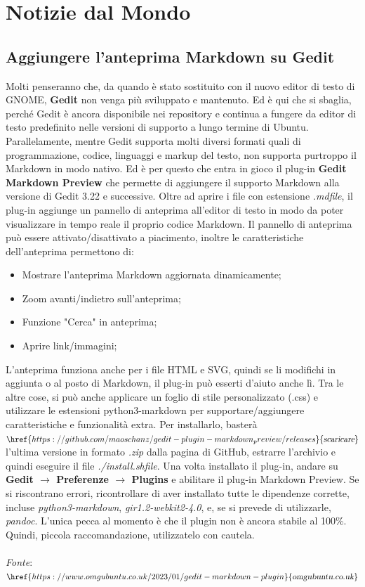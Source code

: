 \documentclass[a4paper,twoside]{article}
\begin{document}
\section{Notizie dal Mondo}
\subsection{Aggiungere l'anteprima Markdown su Gedit}
Molti penseranno che, da quando è stato sostituito con il nuovo editor di testo di GNOME, \textbf{Gedit} non venga più sviluppato e mantenuto. Ed è qui che si sbaglia, perché Gedit è ancora disponibile nei repository e continua a fungere da editor di testo predefinito nelle versioni di supporto a lungo termine di Ubuntu. Parallelamente, mentre Gedit supporta molti diversi formati quali di programmazione, codice, linguaggi e markup del testo, non supporta purtroppo il Markdown in modo nativo. Ed è per questo che entra in gioco il plug-in \textbf{Gedit Markdown Preview} che permette di aggiungere il supporto Markdown alla versione di Gedit 3.22 e successive. Oltre ad aprire i file con estensione \textsl{.mdfile}, il plug-in aggiunge un pannello di anteprima all'editor di testo in modo da poter visualizzare in tempo reale il proprio codice Markdown. Il pannello di anteprima può essere attivato/disattivato a piacimento, inoltre le caratteristiche dell'anteprima permettono di:

\begin{itemize}
\item Mostrare l'anteprima Markdown aggiornata dinamicamente;
\item Zoom avanti/indietro sull'anteprima;
\item Funzione "Cerca" in anteprima;
\item Aprire link/immagini;
\end{itemize}

L'anteprima funziona anche per i file HTML e SVG, quindi se li modifichi in aggiunta o al posto di Markdown, il plug-in può esserti d'aiuto anche lì. Tra le altre cose, si può anche applicare un foglio di stile personalizzato (.css) e utilizzare le estensioni python3-markdown per supportare/aggiungere caratteristiche e funzionalità extra. Per installarlo, basterà $\href{https://github.com/maoschanz/gedit-plugin-markdown_preview/releases}{\textsl{scaricare}}$ l'ultima versione in formato \textsl{.zip} dalla pagina di GitHub, estrarre l'archivio e quindi eseguire il file \textsl{./install.shfile}. Una volta installato il plug-in, andare su \textbf{Gedit $\rightarrow$ Preferenze $\rightarrow$ Plugins} e abilitare il plug-in Markdown Preview. Se si riscontrano errori, ricontrollare di aver installato tutte le dipendenze corrette, incluse \textsl{python3-markdown}, \textsl{gir1.2-webkit2-4.0}, e, se si prevede di utilizzarle, \textsl{pandoc}. L'unica pecca al momento è che il plugin non è ancora stabile al 100\%. Quindi, piccola raccomandazione, utilizzatelo con cautela.\\
\\
\textit{Fonte}:\\
$\href{https://www.omgubuntu.co.uk/2023/01/gedit-markdown-plugin}{\textsl{omgubuntu.co.uk}}$
\end{document}
